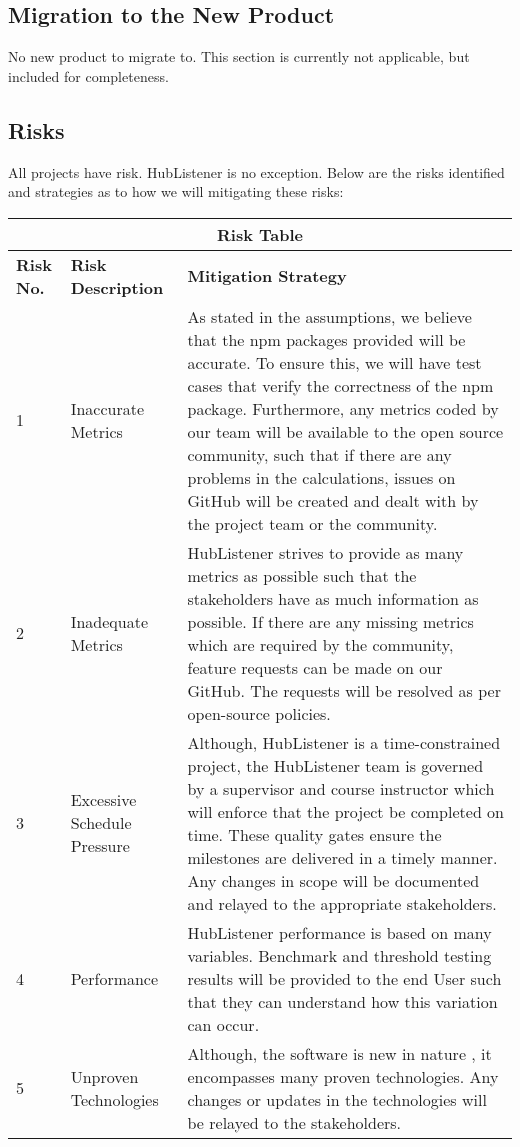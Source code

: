 \documentclass{article}
\begin{document}
\subsection{Migration to the New Product}

No new product to migrate to. This section is currently not applicable, but included for completeness. 
\subsection{Risks}

All projects have risk. HubListener is no exception. Below are the risks identified and strategies as to how we will mitigating these risks:

\begin{tabular}{ |p{1cm}|p{5cm}|p{8cm}| }
\hline
\multicolumn{3}{|c|}{\textbf{Risk Table}} \\
\hline
\textbf{Risk No.} & \textbf{Risk Description} & \textbf{Mitigation Strategy} \\
\hline 
1 & Inaccurate Metrics & As stated in the assumptions, we believe that the npm packages provided will be accurate. To ensure this, we will have test cases that verify the correctness of the npm package. Furthermore, any metrics coded by our team will be available to the open source community, such that if there are any problems in the calculations, issues on GitHub will be created and dealt with by the project team or the community. \\
\hline 
2 & Inadequate Metrics & HubListener strives to provide as many metrics as possible such that the stakeholders have as much information as possible. If there are any missing metrics which are required by the community, feature requests can be made on our GitHub. The requests will be resolved as per open-source policies. \\
\hline 
3 & Excessive Schedule Pressure & Although, HubListener is a time-constrained project, the HubListener team is governed by a supervisor and course instructor which will enforce that the project be completed on time. These quality gates ensure the milestones are delivered in a timely manner. Any changes in scope will be documented and relayed to the appropriate stakeholders. \\ 
\hline 
4 & Performance  & HubListener performance is based on many variables. Benchmark and threshold testing results will be provided to the end User such that they can understand how this variation can occur. \\
\hline 
5 & Unproven Technologies & Although, the software is new in nature , it encompasses many proven technologies. Any changes or updates in the technologies will be relayed to the stakeholders. \\
\hline
\end{tabular}
\end{document}
